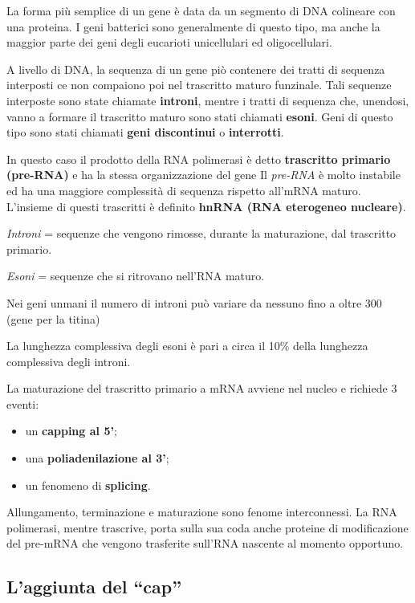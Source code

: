 \documentclass[11pt]{book}
\begin{document}
La forma più semplice di un gene è data da un segmento di DNA colineare
con una proteina. I geni batterici sono generalmente di questo tipo, ma
anche la maggior parte dei geni degli eucarioti unicellulari ed
oligocellulari.

A livello di DNA, la sequenza di un gene piò contenere dei tratti di
sequenza interposti ce non compaiono poi nel trascritto maturo
funzinale. Tali sequenze interposte sono state chiamate
\textbf{introni}, mentre i tratti di sequenza che, unendosi, vanno a
formare il trascritto maturo sono stati chiamati \textbf{esoni}. Geni di
questo tipo sono stati chiamati \textbf{geni discontinui} o
\textbf{interrotti}.

In questo caso il prodotto della RNA polimerasi è detto
\textbf{trascritto primario (pre-RNA)} e ha la stessa organizzazione del
gene Il \emph{pre-RNA} è molto instabile ed ha una maggiore complessità
di sequenza rispetto all'mRNA maturo. L'insieme di questi trascritti è
definito \textbf{hnRNA (RNA eterogeneo nucleare)}.

\emph{Introni} = sequenze che vengono rimosse, durante la maturazione,
dal trascritto primario.

\emph{Esoni} = sequenze che si ritrovano nell'RNA maturo.

Nei geni unmani il numero di introni può variare da nessuno fino a oltre
300 (gene per la titina)

La lunghezza complessiva degli esoni è pari a circa il 10\% della
lunghezza complessiva degli introni.

La maturazione del trascritto primario a mRNA avviene nel nucleo e
richiede 3 eventi:

\begin{itemize}
\itemsep1pt\parskip0pt
\item
  un \textbf{capping al 5'};
\item
  una \textbf{poliadenilazione al 3'};
\item
  un fenomeno di \textbf{splicing}.
\end{itemize}

Allungamento, terminazione e maturazione sono fenome interconnessi. La
RNA polimerasi, mentre trascrive, porta sulla sua coda anche proteine di
modificazione del pre-mRNA che vengono trasferite sull'RNA nascente al
momento opportuno.

\subsection{\texorpdfstring{L'aggiunta del
``cap''}{L'aggiunta del cap}}\label{laggiunta-del-cap}
\end{document}
